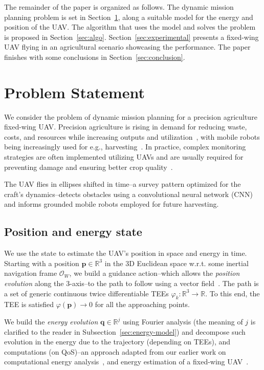 \documentclass[letterpaper,10pt,conference]{ieeeconf}
\begin{document}
The remainder of the paper is organized as follows. The dynamic mission planning problem is set in Section~\ref{sec:prob}, along a suitable model for the energy and position of the UAV. The algorithm that uses the model and solves the problem is proposed in Section~\ref{sec:algo}. Section~\ref{sec:experimental} presents a fixed-wing UAV flying in an agricultural scenario showcasing the performance. The paper finishes with some conclusions in Section~\ref{sec:conclusion}.


\section{Problem Statement}
\label{sec:prob}

We consider the problem of dynamic mission planning for a precision agriculture fixed-wing UAV. Precision agriculture is rising in demand for reducing waste, costs, and resources while increasing outputs and utilization~\cite{hajjaj2014review}, with mobile robots being increasingly used for e.g., harvesting~\cite{qingchun2012study,dong2011development, de2011design, aljanobi2010setup, li2008analysis, edan2000robotic}. In practice, complex monitoring strategies are often implemented utilizing UAVs and are usually required for preventing damage and ensuring better crop quality~\cite{puri2017agriculture}. 

The UAV flies in ellipses shifted in time--a survey pattern optimized for the craft's dynamics--detects obstacles using a convolutional neural network (CNN) and informs grounded mobile robots employed for future harvesting.

\subsection{Position and energy state}
\label{sec:model}

We use the state to estimate the UAV's position in space and energy in time. Starting with a position $\mathbf{p}\in\mathbb{R}^3$ in the 3D Euclidean space w.r.t. some inertial navigation frame $\mathcal{O}_W$, we build a guidance action--which allows the \emph{position evolution} along the 3-axis--to the path to follow using a vector field~\cite{de2017guidance}. The path is a set of generic continuous twice differentiable TEEs $\varphi_k:\mathbb{R}^3\rightarrow\mathbb{R}$. To this end, the TEE is satisfied $\varphi(\mathbf{p})\rightarrow 0$ for all the approaching points.

We build the \emph{energy evolution} $\mathbf{q}\in\mathbb{R}^j$ using Fourier analysis (the meaning of $j$ is clarified to the reader in Subsection~\ref{sec:energy-model}) and decompose such evolution in the energy due to the trajectory (depending on TEEs), and computations (on QoS)--an approach adapted from our earlier work on computational energy analysis~\cite{seewald2019coarse, seewald2019component}, and energy estimation of a fixed-wing UAV~\cite{seewald2020mechanical}.
\end{document}
